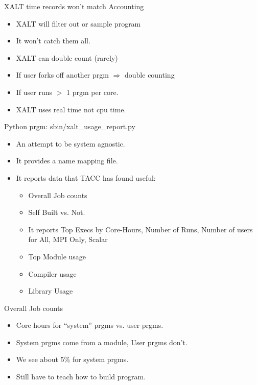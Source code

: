 \documentclass{beamer}
\begin{document}
\begin{frame}{XALT time records won't match Accounting}
  \begin{itemize}
    \item XALT will filter out or sample program
    \item It won't catch them all.
    \item XALT can double count (rarely)
    \item If user forks off another prgm $\Rightarrow$ double counting
    \item If user runs $>$ 1 prgm per core.
    \item XALT uses real time not cpu time.
  \end{itemize}
\end{frame}

\begin{frame}{Python prgm: sbin/xalt\_usage\_report.py}
  \begin{itemize}
    \item An attempt to be system agnostic.
    \item It provides a name mapping file.
    \item It reports data that TACC has found useful:
      \begin{itemize}
        \item Overall Job counts
        \item Self Built vs. Not.
        \item It reports Top Execs by Core-Hours, Number of Runs,
          Number of users for All, MPI Only, Scalar
        \item Top Module usage
        \item Compiler usage
        \item Library Usage
      \end{itemize}
  \end{itemize}
\end{frame}

\begin{frame}{Overall Job counts}
  \begin{itemize}
    \item Core hours for ``system'' prgms vs. user prgms.
    \item System prgms come from a module, User prgms don't.
    \item We see about 5\% for system prgms.
    \item Still have to teach how to build program.
  \end{itemize}
\end{frame}
\end{document}
